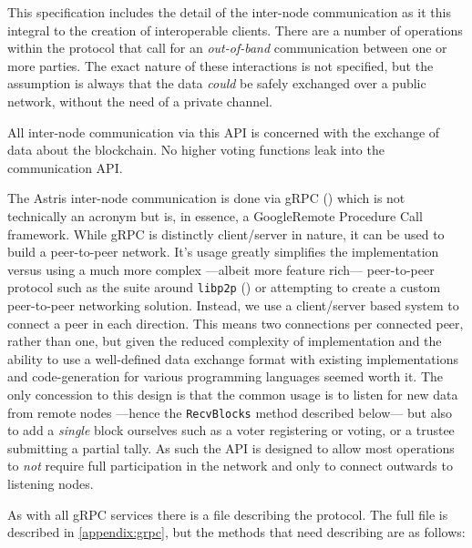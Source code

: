 This specification includes the detail of the inter-node communication as it this integral to the creation of interoperable clients. There are a number of operations within the protocol that call for an \emph{out-of-band} communication between one or more parties. The exact nature of these interactions is not specified, but the assumption is always that the data \emph{could} be safely exchanged over a public network, without the need of a private channel.

All inter-node communication via this API is concerned with the exchange of data about the blockchain. No higher voting functions leak into the communication API.

The Astris inter-node communication is done via gRPC () which is not technically an acronym but is, in essence, a Google\texttrademark Remote Procedure Call framework. While gRPC is distinctly client/server in nature, it can be used to build a peer-to-peer network. It's usage greatly simplifies the implementation versus using a much more complex ---albeit more feature rich--- peer-to-peer protocol such as the suite around \texttt{libp2p} () or attempting to create a custom peer-to-peer networking solution. Instead, we use a client/server based system to connect a peer in each direction. This means two connections per connected peer, rather than one, but given the reduced complexity of implementation and the ability to use a well-defined data exchange format with existing implementations and code-generation for various programming languages seemed worth it. The only concession to this design is that the common usage is to listen for new data from remote nodes ---hence the \texttt{RecvBlocks} method described below--- but also to add a \emph{single} block ourselves such as a voter registering or voting, or a trustee submitting a partial tally. As such the API is designed to allow most operations to \emph{not} require full participation in the network and only to connect outwards to listening nodes.

As with all gRPC services there is a file describing the protocol. The full file is described in \autoref{appendix:grpc}, but the methods that need describing are as follows:

